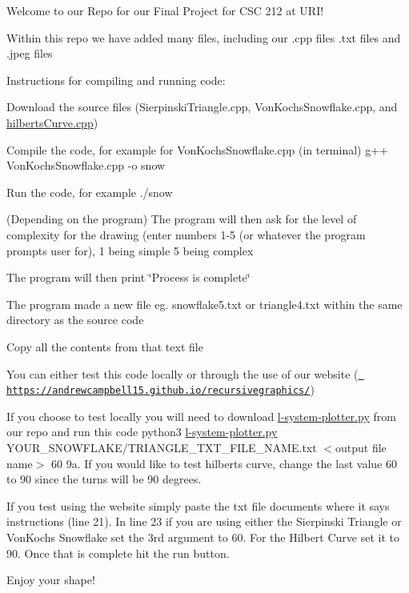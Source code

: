 Welcome to our Repo for our Final Project for CSC 212 at URI!

Within this repo we have added many files, including our .cpp files .txt files and .jpeg files

Instructions for compiling and running code\+:


\begin{DoxyEnumerate}
\item Download the source files (Sierpinski\+Triangle.\+cpp, Von\+Koch\textquotesingle{}s\+Snowflake.\+cpp, and \mbox{\hyperlink{hilberts_curve_8cpp}{hilberts\+Curve.\+cpp}})
\item Compile the code, for example for Von\+Koch\textquotesingle{}s\+Snowflake.\+cpp (in terminal) \textquotesingle{}g++ Von\+Koch\textquotesingle{}s\+Snowflake.\+cpp -\/o snow\textquotesingle{}
\item Run the code, for example \textquotesingle{}./snow\textquotesingle{}
\item (Depending on the program) The program will then ask for the level of complexity for the drawing (enter numbers 1-\/5 (or whatever the program prompts user for), 1 being simple 5 being complex
\item The program will then print \char`\"{}\+Process is complete\char`\"{}
\item The program made a new file eg. snowflake5.\+txt or triangle4.\+txt within the same directory as the source code
\item Copy all the contents from that text file
\item You can either test this code locally or through the use of our website (\href{https://andrewcampbell15.github.io/recursivegraphics/}{\texttt{ https\+://andrewcampbell15.\+github.\+io/recursivegraphics/}})
\item If you choose to test locally you will need to download \textquotesingle{}\mbox{\hyperlink{l-system-plotter_8py}{l-\/system-\/plotter.\+py}}\textquotesingle{} from our repo and run this code \textquotesingle{}python3 \mbox{\hyperlink{l-system-plotter_8py}{l-\/system-\/plotter.\+py}} YOUR\+\_\+\+SNOWFLAKE/\+TRIANGLE\+\_\+\+TXT\+\_\+\+FILE\+\_\+\+NAME.\+txt $<$output file name$>$ 60\textquotesingle{} 9a. If you would like to test hilbert\textquotesingle{}s curve, change the last value \textquotesingle{}60\textquotesingle{} to \textquotesingle{}90\textquotesingle{} since the turns will be 90 degrees.
\item If you test using the website simply paste the txt file documents where it says \textquotesingle{}instructions\textquotesingle{} (line 21). In line 23 if you are using either the Sierpinski Triangle or Von\+Koch\textquotesingle{}s Snowflake set the 3rd argument to 60. For the Hilbert Curve set it to 90. Once that is complete hit the run button.
\item Enjoy your shape! 
\end{DoxyEnumerate}
